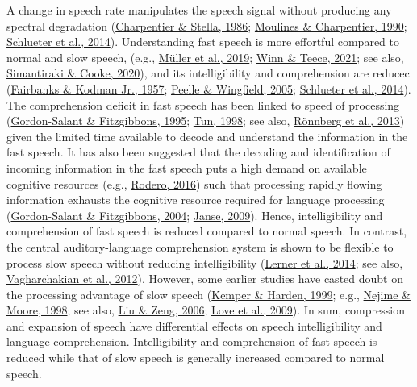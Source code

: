 \documentclass[a4paper, nobind]{templates/ociamthesis}
\begin{document}
A change in speech rate manipulates the speech signal without producing any spectral degradation (\protect\hyperlink{ref-Charpentier1986}{Charpentier \& Stella, 1986}; \protect\hyperlink{ref-Moulines1990}{Moulines \& Charpentier, 1990}; \protect\hyperlink{ref-Schlueter2014}{Schlueter et al., 2014}).
Understanding fast speech is more effortful compared to normal and slow speech, (e.g., \protect\hyperlink{ref-Mueller2019}{Müller et al., 2019}; \protect\hyperlink{ref-Winn2021b}{Winn \& Teece, 2021}; see also, \protect\hyperlink{ref-Simantiraki2020}{Simantiraki \& Cooke, 2020}), and its intelligibility and comprehension are reducec (\protect\hyperlink{ref-Fairbanks1957}{Fairbanks \& Kodman Jr., 1957}; \protect\hyperlink{ref-Peelle2005}{Peelle \& Wingfield, 2005}; \protect\hyperlink{ref-Schlueter2014}{Schlueter et al., 2014}).
The comprehension deficit in fast speech has been linked to speed of processing (\protect\hyperlink{ref-Gordonsalant1995}{Gordon-Salant \& Fitzgibbons, 1995}; \protect\hyperlink{ref-Tun1998}{Tun, 1998}; see also, \protect\hyperlink{ref-Roennberg2013}{Rönnberg et al., 2013}) given the limited time available to decode and understand the information in the fast speech.
It has also been suggested that the decoding and identification of incoming information in the fast speech puts a high demand on available cognitive resources (e.g., \protect\hyperlink{ref-Rodero2016}{Rodero, 2016}) such that processing rapidly flowing information exhausts the cognitive resource required for language processing (\protect\hyperlink{ref-Gordonsalant2004}{Gordon-Salant \& Fitzgibbons, 2004}; \protect\hyperlink{ref-Janse2009}{Janse, 2009}).
Hence, intelligibility and comprehension of fast speech is reduced compared to normal speech.
In contrast, the central auditory-language comprehension system is shown to be flexible to process slow speech without reducing intelligibility (\protect\hyperlink{ref-Lerner2014}{Lerner et al., 2014}; see also, \protect\hyperlink{ref-Vagharchakian2012}{Vagharchakian et al., 2012}).
However, some earlier studies have casted doubt on the processing advantage of slow speech (\protect\hyperlink{ref-Kemper1999}{Kemper \& Harden, 1999}; e.g., \protect\hyperlink{ref-Nejime1998}{Nejime \& Moore, 1998}; see also, \protect\hyperlink{ref-Liu2006}{Liu \& Zeng, 2006}; \protect\hyperlink{ref-Love2009}{Love et al., 2009}).
In sum, compression and expansion of speech have differential effects on speech intelligibility and language comprehension.
Intelligibility and comprehension of fast speech is reduced while that of slow speech is generally increased compared to normal speech.
\end{document}
